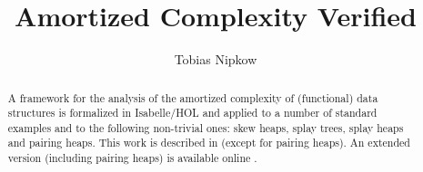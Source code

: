 \documentclass[11pt,a4paper]{article}
\begin{document}
\title{Amortized Complexity Verified}
\author{Tobias Nipkow}
\maketitle

\begin{abstract}
A framework for the analysis of the amortized complexity of (functional)
data structures is formalized in Isabelle/HOL and applied to a number of
standard examples and to the following non-trivial ones: skew heaps,
splay trees, splay heaps and pairing heaps. This work is described
in \cite{Nipkow-ITP15} (except for pairing heaps).
An extended version (including pairing heaps) is available online
\cite{Nipkow-Brinkop}.
\end{abstract}

\setcounter{tocdepth}{2}
\tableofcontents
\newpage





\end{document}

